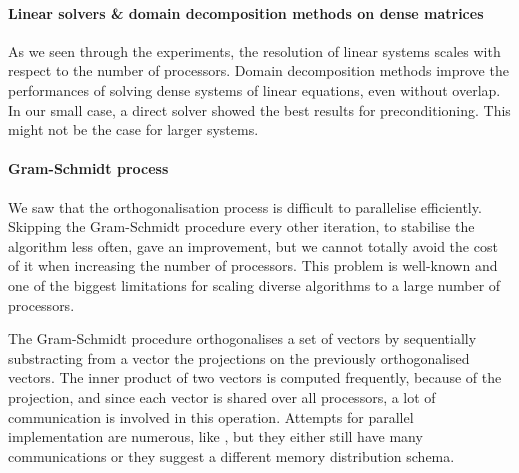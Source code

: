\paragraph{Linear solvers \& domain decomposition methods on dense matrices}
As we seen through the experiments, the resolution of linear systems scales with respect to the number of processors.
Domain decomposition methods improve the performances of solving dense systems of linear equations, even without overlap.
In our small case, a direct solver showed the best results for preconditioning.
This might not be the case for larger systems. %

\paragraph{Gram-Schmidt process}
We saw that the orthogonalisation process is difficult to parallelise efficiently.
Skipping the Gram-Schmidt procedure every other iteration, to stabilise the algorithm less often, gave an improvement, but we cannot totally avoid the cost of it when increasing the number of processors.
This problem is well-known and one of the biggest limitations for scaling diverse algorithms to a large number of processors.

The Gram-Schmidt procedure orthogonalises a set of vectors by sequentially substracting from a vector the projections on the previously orthogonalised vectors.
The inner product of two vectors is computed frequently, because of the projection, and since each vector is shared over all processors, a lot of communication is involved in this operation.
Attempts for parallel implementation are numerous, like \cite{katagiri_parallel_gram_schmidt_2003}, but they either still have many communications or they suggest a different memory distribution schema.

